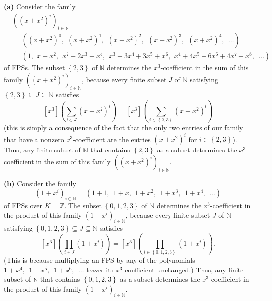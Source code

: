 \begin{example}
\textbf{(a)} Consider the family
\begin{align*}
&  \left(  \left(  x+x^{2}\right)  ^{i}\right)  _{i\in\mathbb{N}}\\
&  =\left(  \left(  x+x^{2}\right)  ^{0},\ \ \left(  x+x^{2}\right)
^{1},\ \ \left(  x+x^{2}\right)  ^{2},\ \ \left(  x+x^{2}\right)
^{3},\ \ \left(  x+x^{2}\right)  ^{4},\ \ \ldots\right) \\
&  =\left(  1,\ \ x+x^{2},\ \ x^{2}+2x^{3}+x^{4},\ \ x^{3}+3x^{4}+3x^{5}%
+x^{6},\ \ x^{4}+4x^{5}+6x^{6}+4x^{7}+x^{8},\ \ \ldots\right)
\end{align*}
of FPSs. The subset $\left\{  2,3\right\}  $ of $\mathbb{N}$ determines the
$x^{3}$-coefficient in the sum of this family $\left(  \left(  x+x^{2}\right)
^{i}\right)  _{i\in\mathbb{N}}$, because every finite subset $J$ of
$\mathbb{N}$ satisfying $\left\{  2,3\right\}  \subseteq J\subseteq\mathbb{N}$
satisfies%
\[
\left[  x^{3}\right]  \left(  \sum_{i\in J}\left(  x+x^{2}\right)
^{i}\right)  =\left[  x^{3}\right]  \left(  \sum_{i\in\left\{  2,3\right\}
}\left(  x+x^{2}\right)  ^{i}\right)
\]
(this is simply a consequence of the fact that the only two entries of our
family that have a nonzero $x^{3}$-coefficient are the entries $\left(
x+x^{2}\right)  ^{i}$ for $i\in\left\{  2,3\right\}  $). Thus, any finite
subset of $\mathbb{N}$ that contains $\left\{  2,3\right\}  $ as a subset
determines the $x^{3}$-coefficient in the sum of this family $\left(  \left(
x+x^{2}\right)  ^{i}\right)  _{i\in\mathbb{N}}$. \medskip

\textbf{(b)} Consider the family%
\[
\left(  1+x^{i}\right)  _{i\in\mathbb{N}}=\left(  1+1,\ \ 1+x,\ \ 1+x^{2}%
,\ \ 1+x^{3},\ \ 1+x^{4},\ \ \ldots\right)
\]
of FPSs over $K=\mathbb{Z}$. The subset $\left\{  0,1,2,3\right\}  $ of
$\mathbb{N}$ determines the $x^{3}$-coefficient in the product of this family
$\left(  1+x^{i}\right)  _{i\in\mathbb{N}}$, because every finite subset $J$
of $\mathbb{N}$ satisfying $\left\{  0,1,2,3\right\}  \subseteq J\subseteq
\mathbb{N}$ satisfies%
\[
\left[  x^{3}\right]  \left(  \prod_{i\in J}\left(  1+x^{i}\right)  \right)
=\left[  x^{3}\right]  \left(  \prod_{i\in\left\{  0,1,2,3\right\}  }\left(
1+x^{i}\right)  \right)  .
\]
(This is because multiplying an FPS by any of the polynomials $1+x^{4}%
,\ \ 1+x^{5},\ \ 1+x^{6},\ \ \ldots$ leaves its $x^{3}$-coefficient
unchanged.) Thus, any finite subset of $\mathbb{N}$ that contains $\left\{
0,1,2,3\right\}  $ as a subset determines the $x^{3}$-coefficient in the
product of this family $\left(  1+x^{i}\right)  _{i\in\mathbb{N}}$.


\end{example}
